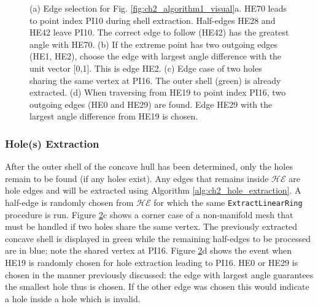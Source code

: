 \begin{figure}[ht]
\begin{subfigure}[t]{.25\linewidth}
    \caption{}
    \label{fig:ch2_example2_choice}
  \end{subfigure}
  \caption[Overview of boundary following procedure]{(a) Edge selection for Fig. \ref{fig:ch2_algorithm1_visual}a.  HE70 leads to point index PI10 during shell extraction. Half-edges HE28 and HE42 leave PI10. The correct edge to follow (HE42) has the greatest angle with HE70. (b) If the extreme point has two outgoing edges (HE1, HE2), choose the edge with largest angle difference with the unit vector [0,1]. This is edge HE2. (c) Edge case of two holes sharing the same vertex at PI16. The outer shell (green) is already extracted. (d) When traversing from HE19 to point index PI16, two outgoing edges (HE0 and HE29) are found. Edge HE29  with the largest angle difference from HE19 is chosen. }
  \label{fig:ch2_example1} 
\end{figure}


\subsubsection{Hole(s) Extraction}

After the outer shell of the concave hull has been determined, only the holes remain to be found (if any holes exist). Any edges that remains inside $\mathcal{HE}$ are hole edges and will be extracted using Algorithm \ref{alg:ch2_hole_extraction}.  A half-edge is randomly chosen from $\mathcal{HE}$ for which the same \texttt{ExtractLinearRing} procedure is run. Figure \ref{fig:ch2_example1}c shows a corner case of a non-manifold mesh that must be handled if two holes share the same vertex. The previously extracted concave shell is displayed in green while the remaining half-edges to be processed are in blue; note the shared vertex at PI16.  Figure \ref{fig:ch2_example1}d shows the event when HE19 is randomly chosen for hole extraction leading to PI16. HE0 or HE29 is chosen in the manner previously discussed: the edge with largest angle guarantees the smallest hole thus is chosen.  If the other edge was chosen this would indicate a hole inside a hole which is invalid.


